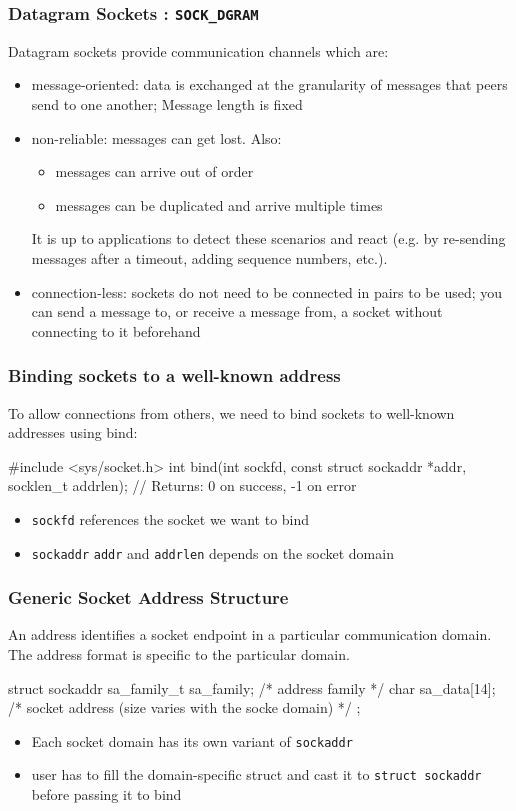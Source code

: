 \documentclass[newPxFont,sthlmFooter,nooffset]{beamer}
\begin{document}
\begin{frame}[t, fragile]
  \frametitle{Datagram Sockets : \texttt{SOCK\_DGRAM}}
Datagram sockets provide communication channels which are:
\begin{itemize}
\item message-oriented: data is exchanged at the granularity of messages that peers send to one another; Message length is fixed
\item non-reliable: messages can get lost. Also:
  \begin{itemize}
  \item messages can arrive out of order 
  \item messages can be duplicated and arrive multiple times
  \end{itemize}
  It is up to applications to detect these scenarios and react
  (e.g. by re-sending messages after a timeout, adding sequence
  numbers, etc.).
\item connection-less: sockets do not need to be connected in pairs to be used; you can send a message to, or receive a message from, a socket without connecting to it beforehand
\end{itemize}

\end{frame}


\begin{frame}[t, fragile]
  \frametitle{Binding sockets to a well-known address}
To allow connections from others, we need to bind sockets to well-known addresses using bind:
\begin{codedef}
#include <sys/socket.h>
int bind(int sockfd, const struct sockaddr *addr, socklen_t addrlen);
// Returns: 0 on success, -1 on error
\end{codedef}
\begin{itemize}
\item \texttt{sockfd} references the socket we want to bind
\item \texttt{sockaddr} \texttt{addr} and \texttt{addrlen} depends on the socket domain
\end{itemize}
\end{frame}


\begin{frame}[t, fragile]
  \frametitle{Generic Socket Address Structure}
An address identifies a socket endpoint in a particular communication domain. The address format is specific to the particular domain.

\begin{codedefnb}
 struct sockaddr {
     sa_family_t  sa_family;    /* address family */
     char         sa_data[14];  /* socket address (size varies with the socke domain) */
}; 
\end{codedefnb}
\begin{itemize}
\item Each socket domain has its own variant of \texttt{sockaddr}
\item user has to fill the domain-specific struct and cast it to \texttt{struct sockaddr} before passing it to bind
\end{itemize}
\end{frame}
\end{document}
